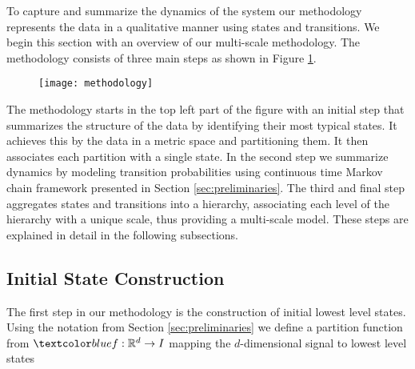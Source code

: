 \iffalse
\begin{itemize}
	\item Initial state construction (State Identification)
	\item Aggregation (State Aggregation)
	\item Transition probabililties (Modeling transitions)
\end{itemize}
\fi

To capture and summarize the dynamics of the system our methodology represents the data
in a qualitative manner using states and transitions. We begin this section with an overview
of our multi-scale methodology. The methodology consists of three main steps as shown in Figure \ref{fig:methodology}.
\begin{figure}[h!]
	\centering
	\texttt{[image: methodology]}
	\caption{}
	\label{fig:methodology}
\end{figure}
The methodology starts in the top left part of the figure with an initial step that summarizes
the structure of the data by identifying their most typical states. It achieves this by 
the data in a  metric space and partitioning them. It then associates
each partition with a single state.
In the second step we summarize dynamics by modeling transition probabilities using continuous time Markov chain framework presented in Section \ref{sec:preliminaries}.
The third and final step aggregates states and transitions into a hierarchy, associating each
level of the hierarchy with a unique scale, thus providing a multi-scale model. These steps 
are explained in detail in the following subsections.


\subsection{Initial State Construction}
\label{sec:framework-states}

The first step in our methodology is the construction of initial lowest level states. Using the notation
from Section \ref{sec:preliminaries} we define a partition function 
from $\lstopar{f}: \mathbb{R}^d \rightarrow I$ mapping the $d$-dimensional signal to lowest level states

